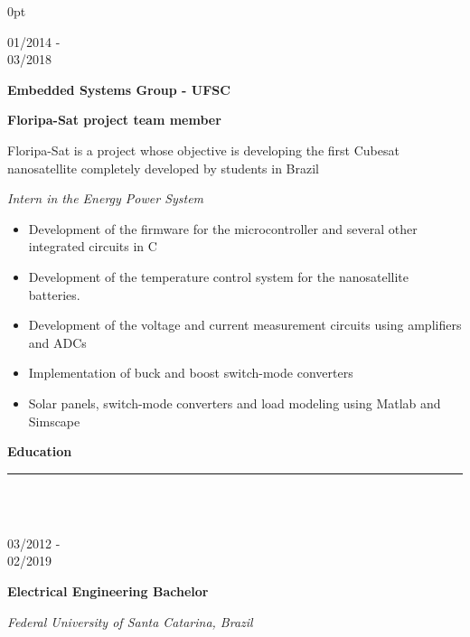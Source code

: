 \documentclass[a4paper]{article}
\begin{document}
\begin{adjustwidth}{\parindent}{0pt}
\begin{minipage}[t]{0.65\textwidth}
\begin{minipage}[t]{0.2\textwidth}
  \large{01/2014 - \\ 03/2018}
\end{minipage}
\begin{minipage}[t]{0.8\textwidth}
{
  \setlength{\parskip}{5.5pt}
  \Large{\textbf{Embedded Systems Group - UFSC}}
  
  \large{\textbf{Floripa-Sat project team member}}
  
  \large{Floripa-Sat is a project whose objective is developing the first Cubesat nanosatellite completely developed by students in Brazil}
  
  \large{\textit{Intern in the Energy Power System}}
}
\begin{itemize}
  \item \normalsize{Development of the firmware for the microcontroller and several other integrated circuits in C}
  \item Development of the temperature control system for the nanosatellite batteries.
  \item Development of the voltage and current measurement circuits using amplifiers and ADCs
  \item Implementation of buck and boost switch-mode converters
  \item Solar panels, switch-mode converters and load modeling using Matlab and Simscape
\end{itemize}
  
\end{minipage}

\Large{\textbf{Education}} \normalsize \\ \rule{\textwidth}{0.5pt} \\ \\
\begin{minipage}[t]{0.2\textwidth}
\large{03/2012 - \\ 02/2019}
\end{minipage}
\begin{minipage}[t]{0.8\textwidth}
{
  \setlength{\parskip}{5.5pt}
  \Large{\textbf{Electrical Engineering Bachelor}}
  
  \large{\textit{Federal University of Santa Catarina, Brazil}} \\
}
\end{minipage} \\ \\


\end{minipage}
\end{adjustwidth}
\end{document}
